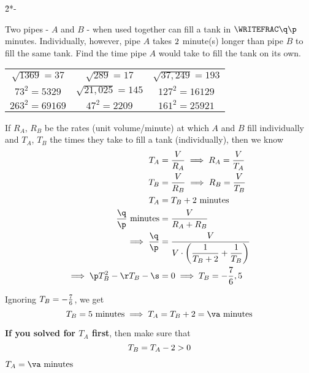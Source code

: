 

\ADD\vb\vd\va
{}\vb\p\q
\EXPR[0]\r{2*\q-\vd*\p}
\MULTIPLY\vd\q\s

\question[4] Two pipes - $A$ and $B$ - when used together can fill a tank in $\WRITEFRAC\q\p$ minutes.
Individually, however, pipe $A$ takes $2$ minute(s) longer than pipe $B$ to fill the same
tank. Find the time pipe $A$ would take to fill the tank on its own. 

\watchout

\begin{calcaid}
  \begin{tabular}{c c c}
    $\sqrt{1369}=37$ & $\sqrt{289}=17$ & $\sqrt{37,249}=193$ \\
		$73^2=5329$ & $\sqrt{21,025}=145$ & $127^2=16129$ \\
		$263^2=69169$ & $47^2=2209$ & $161^2=25921$ 
  \end{tabular}
\end{calcaid}

\begin{solution}[\fullpage]
	If $R_A$, $R_B$ be the rates (unit volume/minute) at which $A$ and $B$ fill individually
	and $T_A$, $T_B$ the times they take to fill a tank (individually), then we know
	\begin{align}
		T_A &= \dfrac{V}{R_A} \implies R_A = \dfrac{V}{T_A}\\
		T_B &= \dfrac{V}{R_B} \implies R_B = \dfrac{V}{T_B}\\
		T_A &= T_B + \vd\text{ minutes} \\
		\dfrac\q\p\text{ minutes} &= \dfrac{V}{R_A + R_B} \\
		\implies\dfrac\q\p &= \dfrac{V}{V\cdot\left(\dfrac{1}{T_B + \vd} + \dfrac{1}{T_B}\right)} \\
		\implies \p T_B^2 - \r T_B - \s &= 0\implies T_B = \vx,\vb
	\end{align}
	
	Ignoring $T_B = -\frac{7}{6}$, we get 
  \[ T_B = \vb\text{ minutes} \implies T_A = T_B + \vd = \va\text{ minutes} \]

  \textbf{If you solved for $T_A$ first}, then make sure that 
  \[T_B = T_A-2 > 0\]
\end{solution}

\ifprintanswers\begin{codex}$T_A=\va\text{ minutes}$\end{codex}\fi
